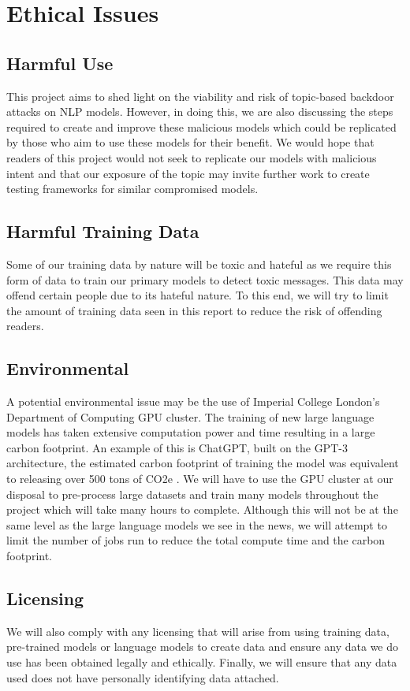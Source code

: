 \chapter{Ethical Issues}

\section{Harmful Use}

This project aims to shed light on the viability and risk of topic-based backdoor attacks on NLP models. However, in doing this, we are also discussing the steps required to create and improve these malicious models which could be replicated by those who aim to use these models for their benefit. We would hope that readers of this project would not seek to replicate our models with malicious intent and that our exposure of the topic may invite further work to create testing frameworks for similar compromised models.

\section{Harmful Training Data}

Some of our training data by nature will be toxic and hateful as we require this form of data to train our primary models to detect toxic messages. This data may offend certain people due to its hateful nature. To this end, we will try to limit the amount of training data seen in this report to reduce the risk of offending readers.


\section{Environmental}

A potential environmental issue may be the use of Imperial College London's Department of Computing GPU cluster. The training of new large language models has taken extensive computation power and time resulting in a large carbon footprint. An example of this is ChatGPT, built on the GPT-3 architecture, the estimated carbon footprint of training the model was equivalent to releasing over 500 tons of CO2e \cite{chat_gpt_environment}. We will have to use the GPU cluster at our disposal to pre-process large datasets and train many models throughout the project which will take many hours to complete. Although this will not be at the same level as the large language models we see in the news, we will attempt to limit the number of jobs run to reduce the total compute time and the carbon footprint.

\section{Licensing}

We will also comply with any licensing that will arise from using training data, pre-trained models or language models to create data and ensure any data we do use has been obtained legally and ethically. Finally, we will ensure that any data used does not have personally identifying data attached.